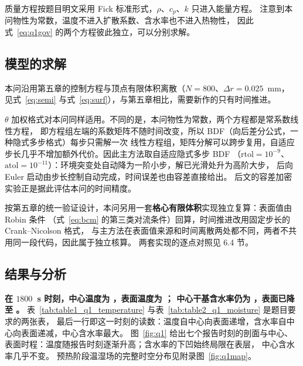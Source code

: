质量方程按题目明文采用 Fick 标准形式，$\rho$、$c_p$、$k$ 只进入能量方程。
注意到本问物性为常数，温度不进入扩散系数、含水率也不进入热物性，
因此式~\eqref{eq:q1gov} 的两个方程彼此独立，可以分别求解。

\subsection{模型的求解}

本问沿用第五章的控制方程与顶点有限体积离散（$N=800$、$\Delta r=0.025$~mm，
见式~\eqref{eq:semi} 与式~\eqref{eq:surf}），与第五章相比，需要新作的只有时间推进。


$\theta$ 加权格式对本问同样适用。不同的是，本问物性为常数，两个方程都是常系数线性方程，
即方程组左端的系数矩阵不随时间改变，所以 BDF（向后差分公式，一种隐式多步格式）每步只需解一次
线性方程组，矩阵分解可以跨步复用，自适应步长几乎不增加额外代价。因此主方法取自适应隐式多步 BDF
（$\mathrm{rtol}=10^{-9}$、$\mathrm{atol}=10^{-11}$）：环境突变处自动降为一阶小步，解已光滑处升为高阶大步，
后向 Euler 启动由步长控制自动完成，时间误差也由容差直接给出。
后文的容差加密实验正是据此评估本问的时间精度。


按第五章的统一验证设计，本问另用一套\textbf{格心有限体积}实现独立复算：表面值由 Robin 条件
（式~\eqref{eq:bcm} 的第三类对流条件）回算，时间推进改用固定步长的 Crank--Nicolson 格式，
与主方法在表面值来源和时间离散两处都不同，两者不共用同一段代码，因此属于独立核算。
两套实现的逐点对照见 6.4 节。

\subsection{结果与分析}





\textbf{在 $1800$~s 时刻，中心温度为 \qoneTcenteroneeightzerozeros，表面温度为 \qoneTsurfaceoneeightzerozeros；
中心干基含水率仍为 \qoneCcenteroneeightzerozeros，表面已降至 \qoneCsurfaceoneeightzerozeros。}
表~\ref{tab:table1_q1_temperature} 与表~\ref{tab:table2_q1_moisture} 是题目要求的两张表，
最后一行即这一时刻的读数：温度自中心向表面递增，含水率自中心向表面递减，中心含水率最大。
图~\ref{fig:q1} 给出七个报告时刻的剖面与中心、表面时程：温度随报告时刻逐渐升高；含水率的下凹始终局限在表层，
中心含水率几乎不变。
预热阶段温湿场的完整时空分布见附录图~\ref{fig:q1map}。



